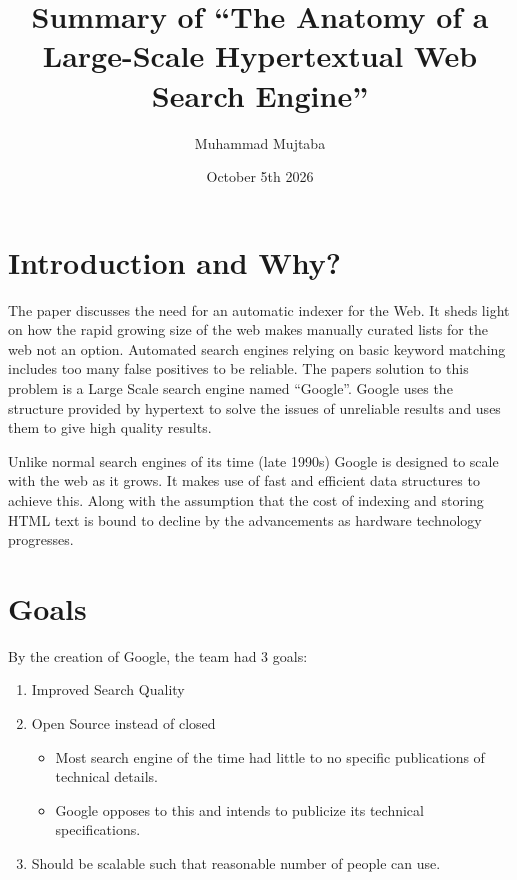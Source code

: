 \documentclass[10pt,a4paper]{article}
\begin{document}
\title{Summary of ``The Anatomy of a Large-Scale Hypertextual Web Search Engine''}
\author{Muhammad Mujtaba}
\date{October 5th 2026}
\maketitle

\section{Introduction and Why?}

The paper discusses the need for an automatic indexer for the Web. It sheds light on how the rapid growing size of the web makes manually curated lists for the web not an option. Automated search engines relying on basic keyword matching includes too many false positives to be reliable. The papers solution to this problem is a Large Scale search engine named ``Google''. Google uses the structure provided by hypertext to solve the issues of unreliable results and uses them to give high quality results.

Unlike normal search engines of its time (late 1990s) Google is designed to scale with the web as it grows. It makes use of fast and efficient data structures to achieve this. Along with the assumption that the cost of indexing and storing HTML text is bound to decline by the advancements as hardware technology progresses.

\section{Goals}

By the creation of Google, the team had 3 goals:

\begin{enumerate}
    \item Improved Search Quality
    \item Open Source instead of closed
    \begin{itemize}
        \item Most search engine of the time had little to no specific publications of technical details.
        \item Google opposes to this and intends to publicize its technical specifications.
    \end{itemize}
    \item Should be scalable such that reasonable number of people can use.
\end{enumerate}
\end{document}
